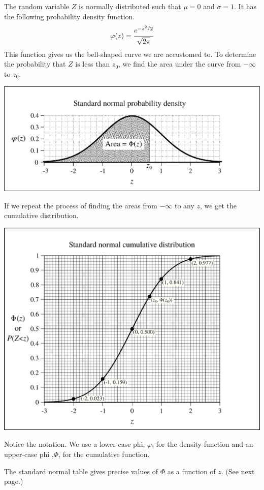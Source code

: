 \documentclass[12pt,letterpaper]{article}
\begin{document}
The random variable $Z$ is normally distributed such that $\mu=0$ and $\sigma=1$. It has the following probability density function.
$$\varphi(z) = \cfrac{e^{-z^2/2}}{\sqrt{2\pi}} $$
This function gives us the bell-shaped curve we are accustomed to. To determine the probability that $Z$ is less than $z_0$, we find the area under the curve from $-\infty$ to $z_0$.
\begin{center}
\includegraphics[scale=.7]{snpdarea.png}
\end{center}
If we repeat the process of finding the areas from $-\infty$ to any $z$, we get the cumulative distribution.
\begin{center}
\includegraphics[scale=.7]{sncd.png}
\end{center}

Notice the notation. We use a lower-case phi, $\varphi$, for the density function and an upper-case phi ,$\Phi$, for the cumulative function.

The standard normal table gives precise values of $\Phi$ as a function of $z$. (See next page.)
\end{document}
